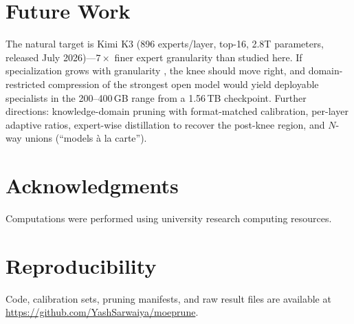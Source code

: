 \documentclass[11pt]{article}
\begin{document}
\section{Future Work}

The natural target is Kimi K3 (896 experts/layer, top-16, 2.8T parameters,
released July 2026)---$7\times$ finer expert granularity than studied here. If
specialization grows with granularity \cite{easyep}, the knee should move
right, and domain-restricted compression of the strongest open model would
yield deployable specialists in the 200--400\,GB range from a 1.56\,TB
checkpoint. Further directions: knowledge-domain pruning with format-matched
calibration, per-layer adaptive ratios, expert-wise distillation to recover the
post-knee region, and $N$-way unions (``models \`a la carte'').

\section*{Acknowledgments}

Computations were performed using university research computing resources.

\section*{Reproducibility}

Code, calibration sets, pruning manifests, and raw result files are available
at \url{https://github.com/YashSarwaiya/moeprune}.
\end{document}
